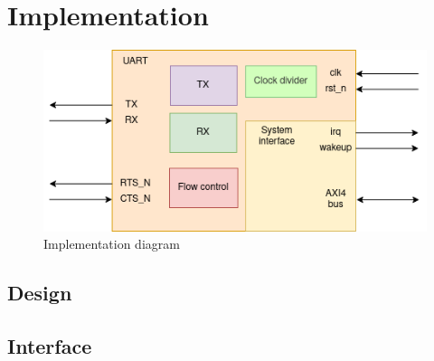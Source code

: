 \documentclass[12pt]{article}
\begin{document}
\section{Implementation}
\begin{figure}[h]
  \centering
  \includegraphics[scale=0.6]{UART_IMPL_DIAGRAM.drawio.png}
  \caption{Implementation diagram}
\end{figure}
\subsection{Design}
\subsection{Interface}
\end{document}
